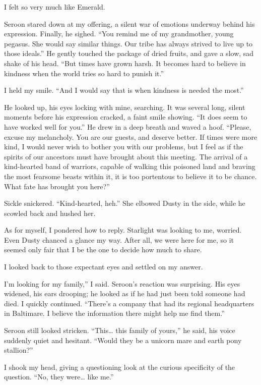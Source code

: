 I felt so very much like Emerald.

Seroon stared down at my offering, a silent war of emotions underway behind his expression. Finally, he sighed. “You remind me of my grandmother, young pegasus. She would say similar things. Our tribe has always strived to live up to those ideals.” He gently touched the package of dried fruits, and gave a slow, sad shake of his head. “But times have grown harsh. It becomes hard to believe in kindness when the world tries so hard to punish it.”

I held my smile. “And I would say that is when kindness is needed the most.”

He looked up, his eyes locking with mine, searching. It was several long, silent moments before his expression cracked, a faint smile showing. “It does seem to have worked well for you.” He drew in a deep breath and waved a hoof. “Please, excuse my melancholy. You are our guests, and deserve better. If times were more kind, I would never wish to bother you with our problems, but I feel as if the spirits of our ancestors must have brought about this meeting. The arrival of a kind-hearted band of warriors, capable of walking this poisoned land and braving the most fearsome beasts within it, it is too portentous to believe it to be chance. What fate has brought you here?”

Sickle snickered. “Kind-hearted, heh.” She elbowed Dusty in the side, while he scowled back and hushed her.

As for myself, I pondered how to reply. Starlight was looking to me, worried. Even Dusty chanced a glance my way. After all, we were here for me, so it seemed only fair that I be the one to decide how much to share.

I looked back to those expectant eyes and settled on my answer.

\leavevmode{}I’m looking for my family,” I said. Seroon’s reaction was surprising. His eyes widened, his ears drooping; he looked as if he had just been told someone had died. I quickly continued. “There’s a company that had its regional headquarters in Baltimare. I believe the information there might help me find them.”

Seroon still looked stricken. “This… this family of yours,” he said, his voice suddenly quiet and hesitant. “Would they be a unicorn mare and earth pony stallion?”

I shook my head, giving a questioning look at the curious specificity of the question. “No, they were… like me.”

